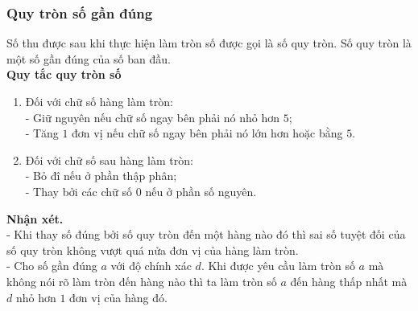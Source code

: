 \subsubsection{Quy tròn số gần đúng}
Số thu được sau khi thực hiện làm tròn số được gọi là số quy tròn. Số quy tròn là một số gần đúng của số ban đầu.\\
\textbf{Quy tắc quy tròn số}
\begin{enumerate}
	\item Đối với chữ số hàng làm tròn:\\
	- Giữ nguyên nếu chữ số ngay bên phải nó nhỏ hơn $5$;\\
	- Tăng $1$ đơn vị nếu chữ số ngay bên phải nó lớn hơn hoặc bằng $5$.
	\item Đối với chữ số sau hàng làm tròn:\\
	- Bỏ đî nếu ở phần thập phân;\\
	- Thay bởi các chữ số $0$ nếu ở phần số nguyên.
\end{enumerate}
\textbf{Nhận xét.}\\
- Khi thay số đúng bởi số quy tròn đến một hàng nào đó thì sai số tuyệt đối của số quy tròn không vượt quá nửa đơn vị của hàng làm tròn.\\
- Cho số gần đúng $a$ với độ chính xác $d$. Khi được yêu cầu làm tròn số $a$ mà không nói rõ làm tròn đến hàng nào thì ta làm tròn số $a$ đến hàng thấp nhất mà $d$ nhỏ hơn $1$ đơn vị của hàng đó.
